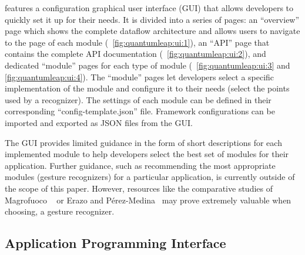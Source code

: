 \ql features a configuration graphical user interface (GUI) that allows developers to quickly set it up for their needs. It is divided into a series of pages: an ``overview'' page which shows the complete dataflow architecture and allows users to navigate to the page of each module (\fig~\ref{fig:quantumleap:ui:1}), an ``API'' page that contains the complete API documentation (\fig~\ref{fig:quantumleap:ui:2}), and dedicated ``module'' pages for each type of module (\fig~\ref{fig:quantumleap:ui:3} and \ref{fig:quantumleap:ui:4}). The ``module'' pages let developers select a specific implementation of the module and configure it to their needs (\eg select the points used by a recognizer). The settings of each module can be defined in their corresponding ``config-template.json'' file. Framework configurations can be imported and exported as JSON files from the GUI.

The GUI provides limited guidance in the form of short descriptions for each implemented module to help developers select the best set of modules for their application. Further guidance, such as recommending the most appropriate modules (\eg gesture recognizers) for a particular application, is currently outside of the scope of this paper. 
However, resources like the comparative studies of Magrofuoco \etal~\cite{Magrofuoco:2021} or Erazo and P\'erez-Medina~\cite{Erazo:2020} may prove extremely valuable when choosing, \eg a gesture recognizer. 



\subsection{Application Programming Interface} \label{sec:quantumleap:description:api}

